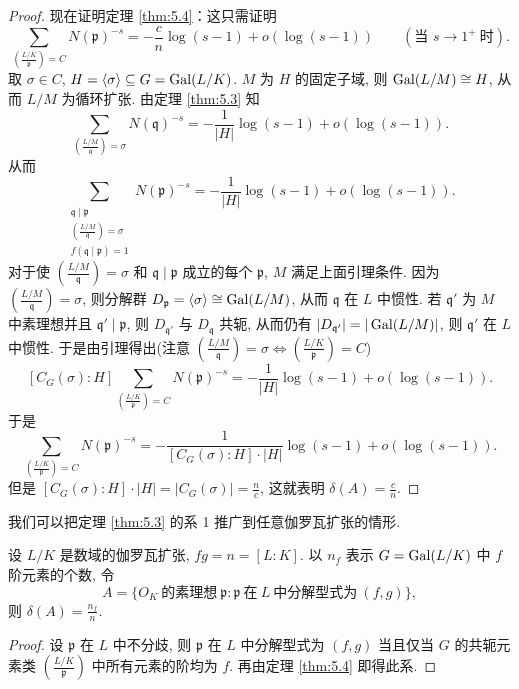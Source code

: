 \begin{proof}
现在证明定理 \ref{thm:5.4}：这只需证明
\[
  \sum_{\left(\frac{L/K}{\mathfrak{p}}\right)=C}N(\mathfrak{p})^{-s}
  =-\frac{c}{n}\log(s-1)+o(\log(s-1))\qquad(\text{当 } s\to1^+\ \text{时}).
\]
取 $\sigma\in C$, $H=\langle\sigma\rangle\subseteq G=\operatorname{Gal}(L/K)$. $M$ 为 $H$ 的固定子域, 则 $\operatorname{Gal}(L/M)\cong H$, 从而 $L/M$ 为循环扩张. 由定理 \ref{thm:5.3} 知
\[
  \sum_{\left(\frac{L/M}{\mathfrak{q}}\right)=\sigma}N(\mathfrak{q})^{-s}
  =-\frac{1}{|H|}\log(s-1)+o(\log(s-1)).
\]
从而
\[
  \sum_{\substack{\mathfrak{q}\mid\mathfrak{p}\\ \left(\frac{L/M}{\mathfrak{q}}\right)=\sigma\\ f(\mathfrak{q}\mid\mathfrak{p})=1}}N(\mathfrak{p})^{-s}
  =-\frac{1}{|H|}\log(s-1)+o(\log(s-1)).
\]
对于使 $\left(\frac{L/M}{\mathfrak{q}}\right)=\sigma$ 和 $\mathfrak{q}\mid\mathfrak{p}$ 成立的每个 $\mathfrak{p}$, $M$ 满足上面引理条件. 因为 $\left(\frac{L/M}{\mathfrak{q}}\right)=\sigma$, 则分解群 $D_{\mathfrak{p}}=\langle\sigma\rangle\cong\operatorname{Gal}(L/M)$, 从而 $\mathfrak{q}$ 在 $L$ 中惯性. 若 $\mathfrak{q}'$ 为 $M$ 中素理想并且 $\mathfrak{q}'\mid\mathfrak{p}$, 则 $D_{\mathfrak{q}'}$ 与 $D_{\mathfrak{q}}$ 共轭, 从而仍有 $|D_{\mathfrak{q}'}|=|\operatorname{Gal}(L/M)|$, 则 $\mathfrak{q}'$ 在 $L$ 中惯性. 于是由引理得出(注意 $\left(\frac{L/M}{\mathfrak{q}}\right)=\sigma\Leftrightarrow\left(\frac{L/K}{\mathfrak{p}}\right)=C$)
\[
  [C_G(\sigma):H]\sum_{\left(\frac{L/K}{\mathfrak{p}}\right)=C}N(\mathfrak{p})^{-s}
  =-\frac{1}{|H|}\log(s-1)+o(\log(s-1)).
\]
于是
\[
  \sum_{\left(\frac{L/K}{\mathfrak{p}}\right)=C}N(\mathfrak{p})^{-s}
  =-\frac{1}{[C_G(\sigma):H]\cdot|H|}\log(s-1)+o(\log(s-1)).
\]
但是 $[C_G(\sigma):H]\cdot|H|=|C_G(\sigma)|=\frac{n}{c}$, 这就表明 $\delta(A)=\frac{c}{n}$. 
\end{proof}

我们可以把定理 \ref{thm:5.3} 的系 1 推广到任意伽罗瓦扩张的情形. 

\begin{corollarynonum}
设 $L/K$ 是数域的伽罗瓦扩张, $fg=n=[L:K]$. 以 $n_f$ 表示 $G=\operatorname{Gal}(L/K)$ 中 $f$ 阶元素的个数, 令
\[
  A=\{O_K\ \text{的素理想}\ \mathfrak{p}:\mathfrak{p}\ \text{在}\ L\ \text{中分解型式为}\ (f,g)\},
\]
则 $\delta(A)=\frac{n_f}{n}$. 
\end{corollarynonum}

\begin{proof}
设 $\mathfrak{p}$ 在 $L$ 中不分歧, 则 $\mathfrak{p}$ 在 $L$ 中分解型式为 $(f,g)$ 当且仅当 $G$ 的共轭元素类 $\left(\frac{L/K}{\mathfrak{p}}\right)$ 中所有元素的阶均为 $f$. 再由定理 \ref{thm:5.4} 即得此系. 
\end{proof}

